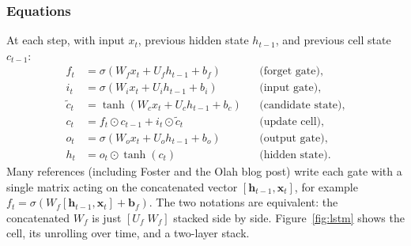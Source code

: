 \documentclass[11pt]{article}
\theoremstyle{remark}
\begin{document}
\subsubsection*{Equations}
At each step, with input $x_t$, previous hidden state $h_{t-1}$, and previous cell state $c_{t-1}$:
\begin{align}
    f_t &= \sigma(W_f x_t + U_f h_{t-1} + b_f) && \text{(forget gate)}, \\
    i_t &= \sigma(W_i x_t + U_i h_{t-1} + b_i) && \text{(input gate)}, \\
    \tilde{c}_t &= \tanh(W_c x_t + U_c h_{t-1} + b_c) && \text{(candidate state)}, \\
    c_t &= f_t \odot c_{t-1} + i_t \odot \tilde{c}_t && \text{(update cell)}, \label{eq:cellupdate}\\
    o_t &= \sigma(W_o x_t + U_o h_{t-1} + b_o) && \text{(output gate)}, \\
    h_t &= o_t \odot \tanh(c_t) && \text{(hidden state)}.
\end{align}
Many references (including Foster and the Olah blog post) write each gate with a single matrix acting on the concatenated vector $[\mathbf{h}_{t-1}, \mathbf{x}_t]$, for example $f_t = \sigma(W_f [\mathbf{h}_{t-1}, \mathbf{x}_t] + \mathbf{b}_f)$. The two notations are equivalent: the concatenated $W_f$ is just $[U_f \; W_f]$ stacked side by side. Figure~\ref{fig:lstm} shows the cell, its unrolling over time, and a two-layer stack.
\end{document}
